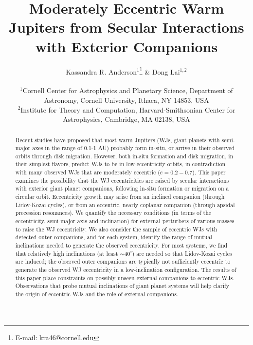 \documentclass[12pt,useAMS, usenatbib]{mn2e}
\begin{document}
 

\title[Eccentric Warm Jupiters from Exterior Companions]{Moderately Eccentric Warm Jupiters from Secular Interactions with Exterior Companions} 
\pagerange{\pageref{firstpage}--\pageref{lastpage}} 

\label{firstpage}

\author[K. R. Anderson \& D. Lai]{Kassandra R. Anderson$^{1}$\thanks{E-mail: kra46@cornell.edu} \& Dong Lai$^{1,2}$ \\ \\ $^{1}$Cornell Center for Astrophysics and Planetary Science, Department of Astronomy, Cornell University, Ithaca, NY 14853, USA \\ $^{2}$Institute for Theory and Computation, Harvard-Smithsonian Center for Astrophysics, Cambridge, MA 02138, USA}

\maketitle

\begin{abstract}
Recent studies have proposed that most warm Jupiters (WJs, giant planets with
semi-major axes in the range of 0.1-1 AU) probably form in-situ, or
arrive in their observed orbits through disk migration. However, both
in-situ formation and disk migration, in their simplest flavors,
predict WJs to be in low-eccentricity orbits, in contradiction with
many observed WJs that are moderately eccentric ($e=0.2-0.7$). This
paper examines the possibility that the WJ eccentricities are raised
by secular interactions with exterior giant planet companions, following in-situ formation or migration on a circular orbit.
Eccentricity growth may arise from an inclined companion (through
Lidov-Kozai cycles), or from an eccentric, nearly coplanar companion (through apsidal precession resonances).  We
quantify the necessary conditions (in terms of the eccentricity,
semi-major axis and inclination) for external perturbers of various
masses to raise the WJ eccentricity.  We also consider the sample of
eccentric WJs with detected outer companions, and for each system,
identify the range of mutual inclinations needed to generate the
observed eccentricity. For most systems, we find that relatively high
inclinations (at least $\sim 40^\circ$) are needed so that Lidov-Kozai
cycles are induced; the observed outer companions are typically not
sufficiently eccentric to generate the observed WJ eccentricity in a
low-inclination configuration.  The results of this paper place
constraints on possibly unseen external companions to eccentric WJs.
Observations that probe mutual inclinations of giant planet systems will help
clarify the origin of eccentric WJs and the role of external companions.

\end{abstract}
\end{document}
